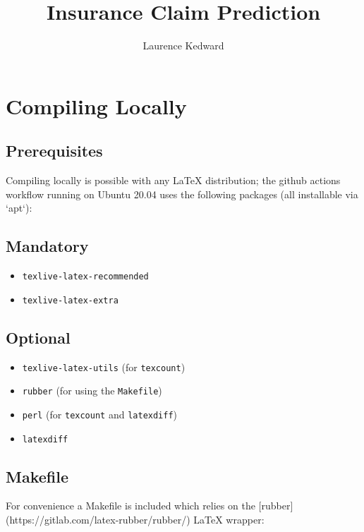 \documentclass[]{article}
\title{Insurance Claim Prediction}
\author{Laurence Kedward}
\begin{document}
\maketitle


\section{Compiling Locally}

\subsection{Prerequisites}

Compiling locally is possible with any LaTeX distribution; the github actions workflow running on Ubuntu 20.04 uses the following packages (all installable via `apt`):

\subsection*{Mandatory}
\begin{itemize}
	
	\item \texttt{texlive-latex-recommended}
	\item \texttt{texlive-latex-extra}
	
\end{itemize}

\subsection*{Optional}
\begin{itemize}
	
	\item \texttt{texlive-latex-utils} \quad (for \texttt{texcount})
	\item \texttt{rubber} \quad (for using the \texttt{Makefile})
	\item \texttt{perl} \quad (for \texttt{texcount} and \texttt{latexdiff})
	\item \texttt{latexdiff}
	
\end{itemize}


\subsection{Makefile}

For convenience a Makefile is included which relies on the [rubber](https://gitlab.com/latex-rubber/rubber/) LaTeX wrapper:
\end{document}
